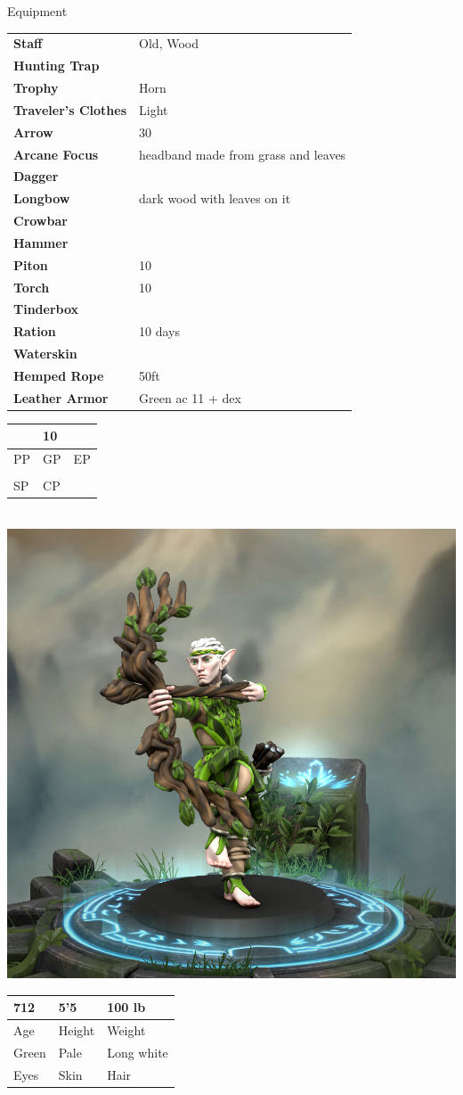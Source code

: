 \documentclass[a4paper,10pt,bg=print]{dndbook} %
\def\Age{712}
\def\Height{5'5}
\def\Weight{100 lb}
\def\Skin{Pale}
\def\Eyes{Green}
\def\Hair{Long white}
\def\PP{}
\def\GP{10}
\def\ElP{}
\def\SP{}
\def\CP{}
\def\Equipment{
	\begin{tabularx}{\textwidth}{lX}
		\textbf{Staff}				& Old, Wood\\
		\textbf{Hunting Trap}		&\\
		\textbf{Trophy}				& Horn\\
		\textbf{Traveler's Clothes}	& Light\\
		\textbf{Arrow}				& 30\\
		\textbf{Arcane Focus}		& headband made from grass and leaves\\
		\textbf{Dagger}				& \\
		\textbf{Longbow}			& dark wood with leaves on it\\
		\textbf{Crowbar}			&\\
		\textbf{Hammer}				&\\
		\textbf{Piton}				& 10\\
		\textbf{Torch}				& 10\\
		\textbf{Tinderbox}			&\\
		\textbf{Ration}				& 10 days\\
		\textbf{Waterskin}			&\\
		\textbf{Hemped Rope}		& 50ft\\
		\textbf{Leather Armor}		& Green ac 11 + dex\\
	\end{tabularx}
}
\begin{document}
	\begin{minipage}[t][\textheight]{.5\linewidth}\normalsize		{\Large Equipment}\\
		\Equipment
	\end{minipage}%
	\begin{minipage}[t][\textheight]{.5\linewidth}\normalsize
		\begin{tabularx}{\textwidth}{XXX}
			\PP&\GP&\ElP\\\hline
			\tiny{PP}&\tiny{GP}	&\tiny{EP}\\
			\SP&\CP&\\\hline
			\tiny{SP}& \tiny{CP}&
		\end{tabularx}\vspace*{.25cm}\\
		\includegraphics[width=\linewidth]{Character.png}\vspace*{.25cm}\\
		\begin{tabularx}{\textwidth}{XXX}
			\Age &\Height &\Weight\\\hline
			\tiny{Age}	& \tiny{Height}	&\tiny{Weight}\\
			\Eyes &\Skin &\Hair\\\hline
			\tiny{Eyes}	& \tiny{Skin}	&\tiny{Hair}\\
		\end{tabularx}
	\end{minipage} %
\end{document}
